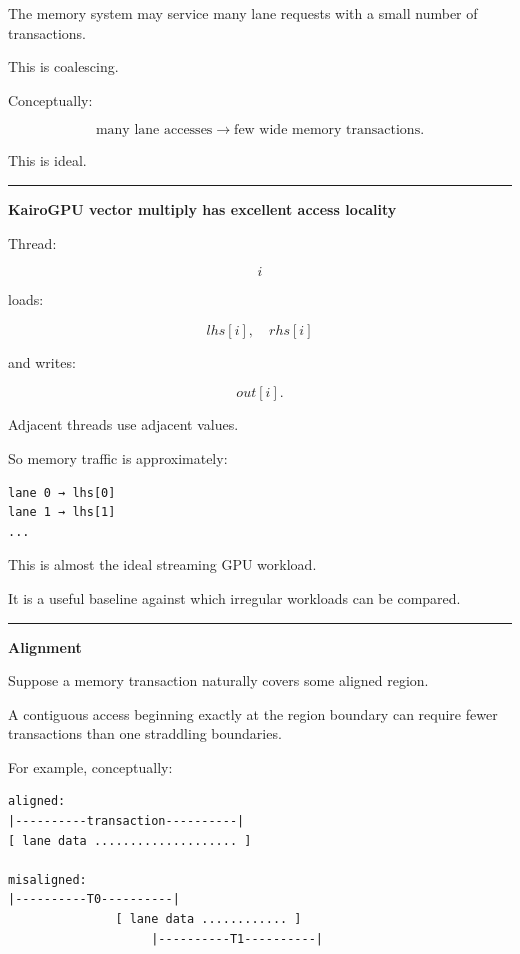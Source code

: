 The memory system may service many lane requests with a small number of transactions.

This is coalescing.

Conceptually:

\[
\boxed{
\text{many lane accesses}
\rightarrow
\text{few wide memory transactions}.
}
\]

This is ideal.

\begin{center}\rule{0.5\linewidth}{0.5pt}\end{center}

\textbf{KairoGPU vector multiply has excellent access locality}

Thread:

\[
i
\]

loads:

\[
lhs[i],
\quad
rhs[i]
\]

and writes:

\[
out[i].
\]

Adjacent threads use adjacent values.

So memory traffic is approximately:

\protect{}\label{r4zgcd}%
\begin{verbatim}
lane 0 → lhs[0]
lane 1 → lhs[1]
...
\end{verbatim}

This is almost the ideal streaming GPU workload.

It is a useful baseline against which irregular workloads can be compared.

\begin{center}\rule{0.5\linewidth}{0.5pt}\end{center}

\textbf{Alignment}

Suppose a memory transaction naturally covers some aligned region.

A contiguous access beginning exactly at the region boundary can require fewer transactions than one straddling boundaries.

For example, conceptually:

\protect{}\label{yfpnbu}%
\begin{verbatim}
aligned:
|----------transaction----------|
[ lane data .................... ]

misaligned:
|----------T0----------|
               [ lane data ............ ]
                    |----------T1----------|
\end{verbatim}

